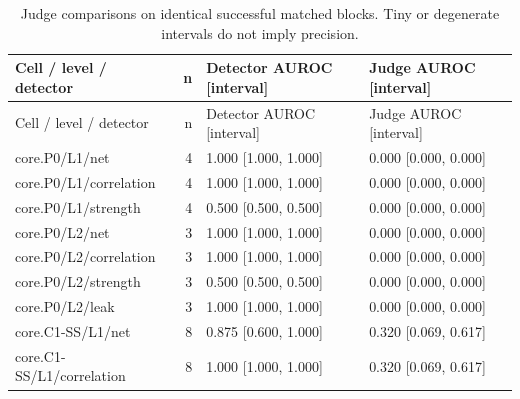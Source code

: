\begingroup\footnotesize\setlength{\tabcolsep}{3pt}
\begin{longtable}{@{}p{1.9in}rl l@{}}
\caption{Judge comparisons on identical successful matched blocks. Tiny or degenerate intervals do not imply precision.}\\
\toprule Cell / level / detector & n & Detector AUROC [interval] & Judge AUROC [interval]\\\midrule\endfirsthead
\toprule Cell / level / detector & n & Detector AUROC [interval] & Judge AUROC [interval]\\\midrule\endhead
\bottomrule\endfoot
core.\allowbreak P0/\allowbreak L1/\allowbreak net & 4 & 1.000 [1.000, 1.000] & 0.000 [0.000, 0.000]\\
core.\allowbreak P0/\allowbreak L1/\allowbreak correlation & 4 & 1.000 [1.000, 1.000] & 0.000 [0.000, 0.000]\\
core.\allowbreak P0/\allowbreak L1/\allowbreak strength & 4 & 0.500 [0.500, 0.500] & 0.000 [0.000, 0.000]\\
core.\allowbreak P0/\allowbreak L2/\allowbreak net & 3 & 1.000 [1.000, 1.000] & 0.000 [0.000, 0.000]\\
core.\allowbreak P0/\allowbreak L2/\allowbreak correlation & 3 & 1.000 [1.000, 1.000] & 0.000 [0.000, 0.000]\\
core.\allowbreak P0/\allowbreak L2/\allowbreak strength & 3 & 0.500 [0.500, 0.500] & 0.000 [0.000, 0.000]\\
core.\allowbreak P0/\allowbreak L2/\allowbreak leak & 3 & 1.000 [1.000, 1.000] & 0.000 [0.000, 0.000]\\
core.\allowbreak C1-SS/\allowbreak L1/\allowbreak net & 8 & 0.875 [0.600, 1.000] & 0.320 [0.069, 0.617]\\
core.\allowbreak C1-SS/\allowbreak L1/\allowbreak correlation & 8 & 1.000 [1.000, 1.000] & 0.320 [0.069, 0.617]\\

\end{longtable}
